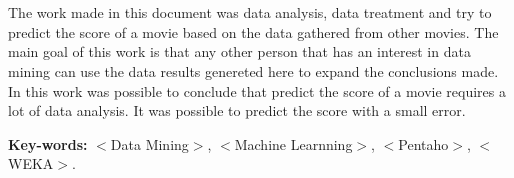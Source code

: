 \section*{} 
The work made in this document was data analysis, data treatment and try to predict the score of a movie based on the data gathered from other movies. The main goal of this work is that any other person that has an interest in data mining can use the data results genereted here to expand the conclusions made. In this work was possible to conclude that predict the score of a movie requires a lot of data analysis. It was possible to predict the score with a small error.

{\bf Key-words:} $<$Data Mining$>$, $<$Machine Learnning$>$, $<$Pentaho$>$, $<$WEKA$>$.